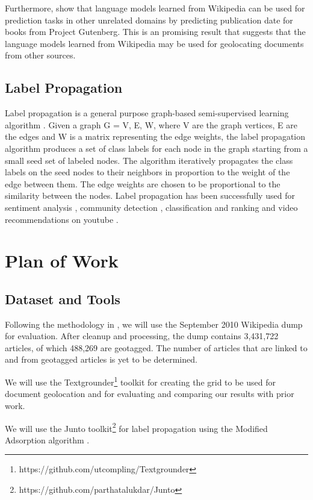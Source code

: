 \documentclass[11pt]{article}
\begin{document}
Furthermore, \cite{kumar-et-al:11} show that language models learned from Wikipedia can be used for prediction tasks in other unrelated domains by predicting publication date for books from Project Gutenberg. This is an promising result that suggests that the language models learned from Wikipedia may be used for geolocating documents from other sources. 

\subsection{Label Propagation}
Label propagation is a general purpose graph-based semi-supervised learning algorithm \cite{zhu2002learning} \cite{talukdar:09}. Given a graph G = {V, E, W}, where V are the graph vertices, E are the edges and W is a matrix representing the edge weights, the label propagation algorithm produces a set of class labels for each node in the graph starting from a small seed set of labeled nodes. The algorithm iteratively propagates the class labels on the seed nodes to their neighbors in proportion to the weight of the edge between them. The edge weights are chosen to be proportional to the similarity between the nodes. Label propagation has been successfully used for sentiment analysis \cite{speriosu2011twitter}, community detection \cite{raghavan2007near}, classification and ranking \cite{talukdar:10} and video recommendations on youtube \cite{baluja2008video}.



\section{Plan of Work}
\subsection{Dataset and Tools}
Following the methodology in \cite{wing-baldridge:11}, we will use the September 2010 Wikipedia dump for evaluation. 
After cleanup and processing, the dump contains 3,431,722  articles, of which 488,269 are geotagged. The number of articles that are linked to and from geotagged articles is yet to be determined.

We will use the Textgrounder\footnote{https://github.com/utcompling/Textgrounder} toolkit for creating the grid to be used for document geolocation and for evaluating and comparing our results with prior work.
 
We will use the Junto toolkit\footnote{https://github.com/parthatalukdar/Junto} for label propagation using the Modified Adsorption algorithm \cite{talukdar:09}.
\end{document}
